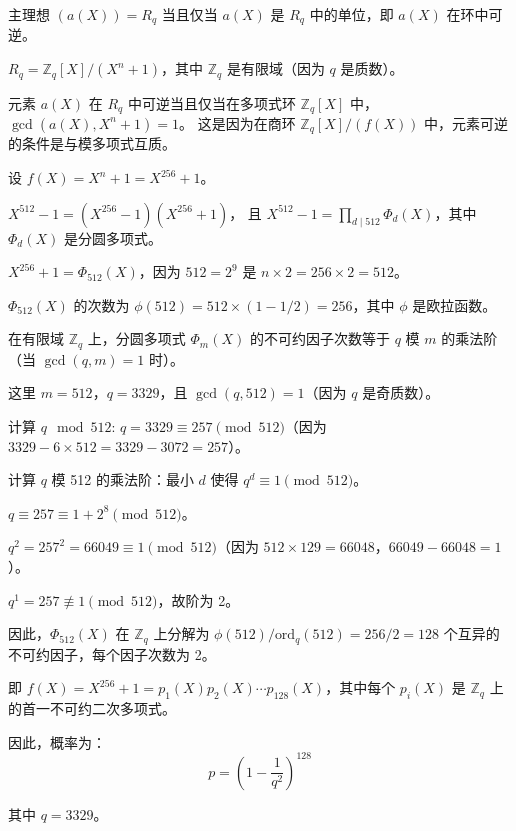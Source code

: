 \documentclass[12pt,a4paper]{article}
\numberwithin{equation}{section}
\begin{document}
主理想 $(a(X)) = R_q$ 当且仅当 $a(X)$ 是 $R_q$ 中的单位，即 $a(X)$ 在环中可逆。

$R_q = \mathbb{Z}_q[X]/(X^n + 1)$，其中 $\mathbb{Z}_q$ 是有限域（因为 $q$ 是质数）。

元素 $a(X)$ 在 $R_q$ 中可逆当且仅当在多项式环 $\mathbb{Z}_q[X]$ 中，$\gcd(a(X), X^n + 1) = 1$。
这是因为在商环 $\mathbb{Z}_q[X]/(f(X))$ 中，元素可逆的条件是与模多项式互质。

设 $f(X) = X^n + 1 = X^{256} + 1$。

$X^{512} - 1 = (X^{256} - 1)(X^{256} + 1)$，
且 $X^{512} - 1 = \prod_{d \mid 512} \Phi_d(X)$，其中 $\Phi_d(X)$ 是分圆多项式。

$X^{256} + 1 = \Phi_{512}(X)$，因为 $512 = 2^9$ 是 $n \times 2 = 256 \times 2 = 512$。

$\Phi_{512}(X)$ 的次数为 $\phi(512) = 512 \times (1 - 1/2) = 256$，其中 $\phi$ 是欧拉函数。

在有限域 $\mathbb{Z}_q$ 上，分圆多项式 $\Phi_m(X)$ 的不可约因子次数等于 $q$ 模 $m$ 的乘法阶（当 $\gcd(q, m) = 1$ 时）。

这里 $m = 512$，$q = 3329$，且 $\gcd(q, 512) = 1$（因为 $q$ 是奇质数）。

计算 $q \mod 512$: $q = 3329 \equiv 257 \pmod{512}$（因为 $3329 - 6 \times 512 = 3329 - 3072 = 257$）。

计算 $q$ 模 512 的乘法阶：最小 $d$ 使得 $q^d \equiv 1 \pmod{512}$。

$q \equiv 257 \equiv 1 + 2^8 \pmod{512}$。

$q^2 = 257^2 = 66049 \equiv 1 \pmod{512}$（因为 $512 \times 129 = 66048$，$66049 - 66048 = 1$）。

$q^1 = 257 \not\equiv 1 \pmod{512}$，故阶为 2。

因此，$\Phi_{512}(X)$ 在 $\mathbb{Z}_q$ 上分解为 $\phi(512) / \text{ord}_q(512) = 256 / 2 = 128$ 个互异的不可约因子，每个因子次数为 2。

即 $f(X) = X^{256} + 1 = p_1(X) p_2(X) \cdots p_{128}(X)$，其中每个 $p_i(X)$ 是 $\mathbb{Z}_q$ 上的首一不可约二次多项式。

因此，概率为：
\begin{equation}
	p = \left(1 - \frac{1}{q^2}\right)^{128}
\end{equation}

其中 $q = 3329$。

\end{document}
